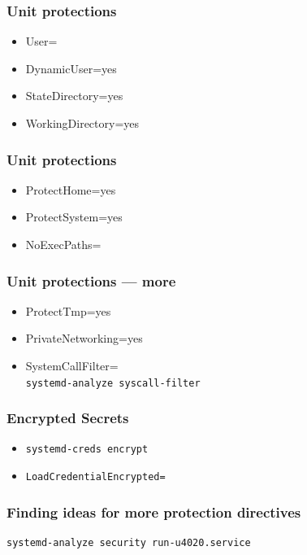 \documentclass[]{beamer}
\begin{document}
\begin{frame}
  \frametitle{Unit protections}

  \begin{itemize}
  \item User=
  \item DynamicUser=yes

  \item StateDirectory=yes
  \item WorkingDirectory=yes

  \end{itemize}
\end{frame}

\begin{frame}
  \frametitle{Unit protections}

  \begin{itemize}
  \item ProtectHome=yes
  \item ProtectSystem=yes
  \item NoExecPaths=
  \end{itemize}
\end{frame}

\begin{frame}
  \frametitle{Unit protections — more}

  \begin{itemize}
  \item ProtectTmp=yes
  \item PrivateNetworking=yes
  \item SystemCallFilter=\\
        \texttt{systemd-analyze syscall-filter}
    
  \end{itemize}
\end{frame}

\begin{frame}
  \frametitle{Encrypted Secrets}

  \begin{itemize}
  \item \texttt{systemd-creds encrypt}
  \item \texttt{LoadCredentialEncrypted=}

  \end{itemize}
\end{frame}

\begin{frame}[fragile]
  \frametitle{Finding ideas for more protection directives}

  \begin{verbatim}
systemd-analyze security run-u4020.service
  \end{verbatim}
\end{frame}
\end{document}
